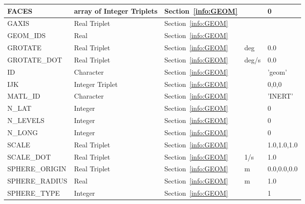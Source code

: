 \documentclass[12pt]{article}
\begin{document}
\begin{longtable}{@{\extracolsep{\fill}}|l|l|l|l|l|}
{\ct FACES}        & array of Integer Triplets     & Section~\ref{info:GEOM}     &           &    0                     \\ \hline
{\ct GAXIS}        & Real Triplet           & Section~\ref{info:GEOM}            &           &                          \\ \hline
{\ct GEOM\_IDS}    & Real                   & Section~\ref{info:GEOM}            &           &                          \\ \hline
{\ct GROTATE}      & Real Triplet           & Section~\ref{info:GEOM}            &  deg      &    0.0                   \\ \hline
{\ct GROTATE\_DOT}  & Real Triplet          & Section~\ref{info:GEOM}            & deg/s     &    0.0                   \\ \hline
{\ct ID}           & Character              & Section~\ref{info:GEOM}            &           &   {\ct 'geom'}           \\ \hline
{\ct IJK}          & Integer Triplet        & Section~\ref{info:GEOM}            &           &   0,0,0                  \\ \hline
{\ct MATL\_ID}     & Character              & Section~\ref{info:GEOM}            &           &  {\ct 'INERT'}           \\ \hline
{\ct N\_LAT}       & Integer                & Section~\ref{info:GEOM}            &           &   0                      \\ \hline
{\ct N\_LEVELS}    & Integer                & Section~\ref{info:GEOM}            &           &   0                      \\ \hline
{\ct N\_LONG}      & Integer                & Section~\ref{info:GEOM}            &           &   0                      \\ \hline
{\ct SCALE}        & Real Triplet           & Section~\ref{info:GEOM}            &           &   1.0,1.0,1.0            \\ \hline
{\ct SCALE\_DOT}   & Real Triplet           & Section~\ref{info:GEOM}            &  1/s      &   1.0                    \\ \hline
{\ct SPHERE\_ORIGIN}& Real Triplet          & Section~\ref{info:GEOM}            &   m       &  0.0,0.0,0.0             \\ \hline
{\ct SPHERE\_RADIUS}& Real                  & Section~\ref{info:GEOM}            &   m       &  1.0                     \\ \hline
{\ct SPHERE\_TYPE} & Integer                & Section~\ref{info:GEOM}            &           &  1                       \\ \hline

\end{longtable}
\end{document}
